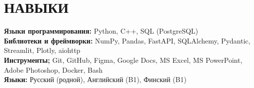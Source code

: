 \documentclass[letterpaper,11pt]{article}
\begin{document}
\section{НАВЫКИ}
 \begin{itemize}[leftmargin=0in, label={}]
    \small{\item{
      \textbf{Языки программирования:} {Python, C++, SQL (PostgreSQL)}\vspace{2pt} \\
      \textbf{Библиотеки и фреймворки:} {NumPy, Pandas, FastAPI, SQLAlchemy, Pydantic, Streamlit, Plotly, aiohttp}\vspace{2pt} \\
      \textbf{Инструменты;} {Git, GitHub, Figma, Google Docs, MS Excel, MS PowerPoint, Adobe Photoshop, Docker, Bash}\vspace{2pt} \\
      \textbf{Языки:} {Русский (родной), Английский (B1), Финский (B1)}
    }}
   \end{itemize}
\end{document}
